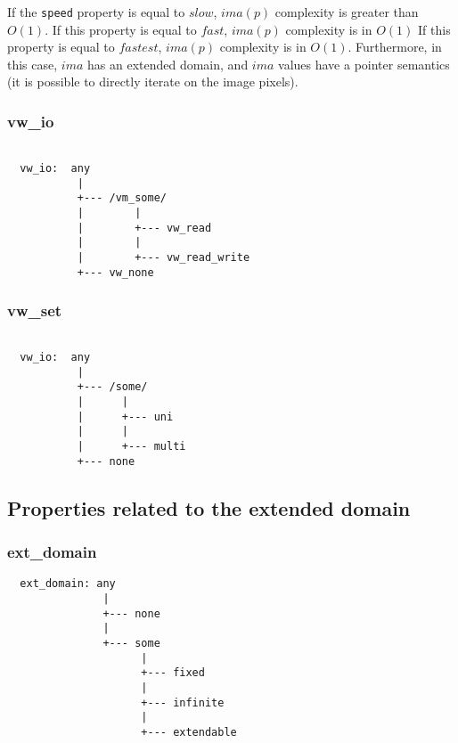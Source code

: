 If the \verb+speed+ property is equal to $slow$, $ima(p)$ complexity is greater
than $O(1)$.
If this property is equal to $fast$, $ima(p)$ complexity is in
$O(1)$
If this property is equal to $fastest$, $ima(p)$ complexity is
in $O(1)$. Furthermore, in this case, $ima$ has an extended domain, and $ima$
values have a pointer semantics (it is possible to directly iterate on the
image pixels).

\subsubsection{vw\_io}

\begin{verbatim}

  vw_io:  any
           |
           +--- /vm_some/
           |        |
           |        +--- vw_read
           |        |
           |        +--- vw_read_write
           +--- vw_none
\end{verbatim}

\subsubsection{vw\_set}

\begin{verbatim}

  vw_io:  any
           |
           +--- /some/
           |      |
           |      +--- uni
           |      |
           |      +--- multi
           +--- none
\end{verbatim}





\subsection{Properties related to the extended domain}

\subsubsection{ext\_domain}

\begin{verbatim}
  ext_domain: any
               |
               +--- none
               |
               +--- some
                     |
                     +--- fixed
                     |
                     +--- infinite
                     |
                     +--- extendable
\end{verbatim}

